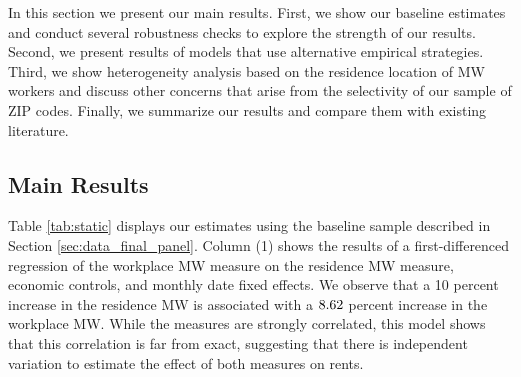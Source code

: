 
In this section we present our main results.
First, we show our baseline estimates and conduct several robustness checks to 
explore the strength of our results.
Second, we present results of models that use alternative empirical strategies.
Third, we show heterogeneity analysis based on the residence location of MW 
workers and discuss other concerns that arise from the selectivity of our 
sample of ZIP codes.
Finally, we summarize our results and compare them with existing literature.

\subsection{Main Results}
\label{sec:results_main}

Table \ref{tab:static} displays our estimates using the baseline sample 
described in Section \ref{sec:data_final_panel}.
Column (1) shows the results of a first-differenced regression of the workplace
MW measure on the residence MW measure, economic controls, and monthly date fixed
effects.
We observe that a 10 percent increase in the residence MW is associated with a
$\textnormal{8.62}$ percent increase in the workplace MW.
While the measures are strongly correlated, this model shows that this 
correlation is far from exact, suggesting that there is independent variation
to estimate the effect of both measures on rents.

